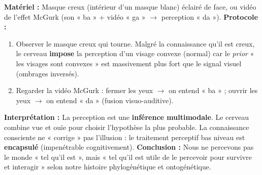 \documentclass[11pt]{article}
\begin{document}
\begin{experience}
\textbf{Matériel :} Masque creux (intérieur d'un masque blanc) éclairé de face, ou vidéo de l'effet McGurk (son « ba » + vidéo « ga » $\to$ perception « da »).
\textbf{Protocole :}
\begin{enumerate}
    \item Observer le masque creux qui tourne. Malgré la connaissance qu'il est creux, le cerveau \textbf{impose} la perception d'un visage convexe (normal) car le \emph{prior} « les visages sont convexes » est massivement plus fort que le signal visuel (ombrages inversés).
    \item Regarder la vidéo McGurk : fermer les yeux $\to$ on entend « ba » ; ouvrir les yeux $\to$ on entend « da » (fusion visuo-auditive).
\end{enumerate}
\textbf{Interprétation :} La perception est une \textbf{inférence multimodale}. Le cerveau combine vue et ouïe pour choisir l'hypothèse la plus probable. La connaissance consciente ne « corrige » pas l'illusion : le traitement perceptif bas niveau est \textbf{encapsulé} (impenétrable cognitivement).
\textbf{Conclusion :} Nous ne percevons pas le monde « tel qu'il est », mais « tel qu'il est utile de le percevoir pour survivre et interagir » selon notre histoire phylogénétique et ontogénétique.
\end{experience}
\end{document}
